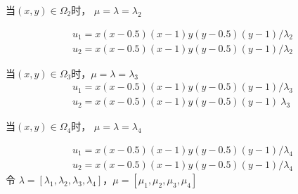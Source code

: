 \documentclass[a4paper,UTF8,titlepage]{ctexart}
\begin{document}
当$(x,y) \in \Omega_2$时， $\mu = \lambda = \lambda_2$

$$
\begin{matrix}
	u_1 = x (x-0.5) (x-1) y (y-0.5) (y-1) / \lambda_2 
	\\
	u_2 = x (x-0.5) (x-1) y (y-0.5) (y-1) / \lambda_2
\end{matrix}
$$

当$(x,y) \in \Omega_3$时，$\mu = \lambda = \lambda_3$
$$
\begin{matrix}
	u_1 = x (x-0.5) (x-1) y (y-0.5) (y-1) / \lambda_3
	\\
	u_2 = x (x-0.5) (x-1) y (y-0.5) (y-1) \ \lambda_3
\end{matrix}
$$

当$(x,y) \in \Omega_4$时， $\mu = \lambda = \lambda_4$

$$
\begin{matrix}
	u_1 = x (x-0.5) (x-1) y (y-0.5) (y-1) / \lambda_4 
	\\
	u_2 = x (x-0.5) (x-1) y (y-0.5) (y-1) / \lambda_4
\end{matrix}
$$
令 $\lambda = [\lambda_1, \lambda_2, \lambda_3, \lambda_4]$，$\mu = [\mu_1, \mu_2, \mu_3, \mu_4]$
\end{document}
